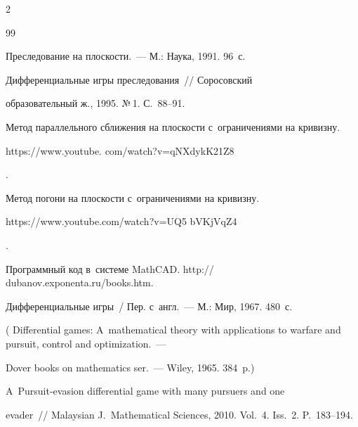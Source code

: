 \begin{multicols}{2}
{{ \begin{thebibliography}{99}










 Преследование на плоскости.~--- М.: Наука, 1991. 96~с. 









 Дифференциальные игры преследования~// Соросовский 


образовательный ж., 1995. №\,1. С.~88--91.







Метод параллельного сближения на плос\-кости с~ограничениями на кривизну. {\sf 


https://www.youtube. com/watch?v=qNXdykK21Z8}.




Метод погони на плос\-кости с~ограничениями на кривизну. {\sf 


https://www.youtube.com/watch?v=UQ5 bVKjVqZ4}.




Программный код в~системе MathCAD. {\sf http:// dubanov.exponenta.ru/books.htm}.







 Дифференциальные игры~/ Пер. с~англ.~--- М.: Мир, 1967. 480~с.


( {Differential games: A~mathematical theory with applications to warfare and pursuit, control and optimization}.~---


Dover books on mathematics ser.~--- Wiley, 1965. 384~p.)







 A~Pursuit-evasion differential game with many pursuers and one 


evader~// Malaysian J.~Mathematical Sciences, 2010. Vol.~4. Iss.~2. P.~183--194.






\end{thebibliography}}}
\end{multicols}
